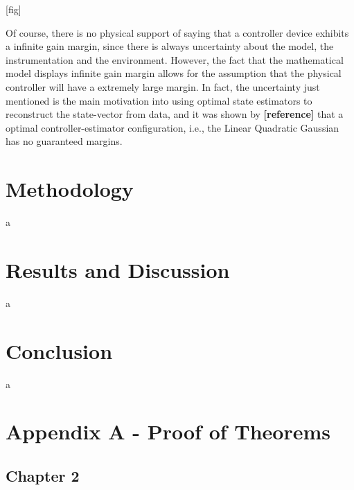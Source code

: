 \documentclass[a4paper,11pt]{book}
\numberwithin{figure}{chapter}
\numberwithin{equation}{chapter}
\numberwithin{table}{chapter}
\theoremstyle{definition}
\begin{document}
[fig]

Of course, there is no physical support of saying that a controller device exhibits a infinite gain margin, since there is always uncertainty about the model, the instrumentation and the environment. However, the fact that the mathematical model displays infinite gain margin allows for the assumption that the physical controller will have a extremely large margin. In fact, the uncertainty just mentioned is the main motivation into using optimal state estimators to reconstruct the state-vector from data, and it was shown by \textbf{[reference]} that a optimal controller-estimator configuration, i.e., the Linear Quadratic Gaussian has no guaranteed margins.

\clearpage
\chapter{Methodology}

a

\clearpage
\chapter{Results and Discussion}

a

\clearpage
\chapter{Conclusion}

a

\clearpage
{}




\clearpage
{}
\chapter*{Appendix A - Proof of Theorems}

\section*{Chapter 2}
\end{document}
